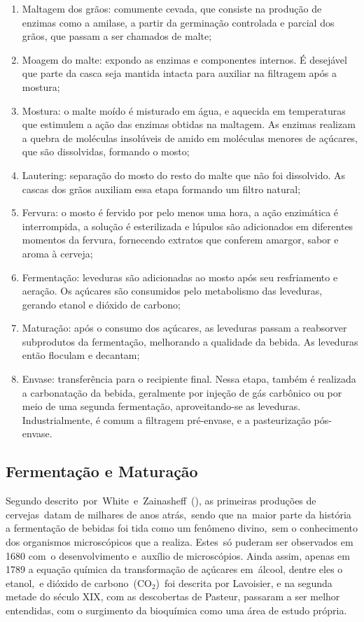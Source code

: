 \begin{enumerate}
    \item Maltagem dos grãos: comumente cevada, que consiste na produção de
enzimas como a amilase, a partir da germinação controlada e parcial dos
grãos, que passam a ser chamados de malte;
    \item Moagem do malte: expondo as enzimas e componentes internos. É desejável
que parte da casca seja mantida intacta para auxiliar na filtragem após a
mostura;
    \item Mostura: o malte moído é misturado em água, e aquecida em temperaturas
que estimulem a ação das enzimas obtidas na maltagem. As enzimas
realizam a quebra de moléculas insolúveis de amido em moléculas menores
de açúcares, que são dissolvidas, formando o mosto;
    \item Lautering: separação do mosto do resto do malte que não foi dissolvido. As
cascas dos grãos auxiliam essa etapa formando um filtro natural;
    \item Fervura: o mosto é fervido por pelo menos uma hora, a ação enzimática é
interrompida, a solução é esterilizada e lúpulos são adicionados em diferentes
momentos da fervura, fornecendo extratos que conferem amargor, sabor e
aroma à cerveja;
    \item Fermentação: leveduras são adicionadas ao mosto após seu resfriamento e
aeração. Os açúcares são consumidos pelo metabolismo das leveduras,
gerando etanol e dióxido de carbono;
    \item Maturação: após o consumo dos açúcares, as leveduras passam a reabsorver
subprodutos da fermentação, melhorando a qualidade da bebida. As
leveduras então floculam e decantam;
    \item Envase: transferência para o recipiente final. Nessa etapa, também é
realizada a carbonatação da bebida, geralmente por injeção de gás carbônico
ou por meio de uma segunda fermentação, aproveitando-se as leveduras.
Industrialmente, é comum a filtragem pré-envase, e a pasteurização pós-
envase.
\end{enumerate}

\subsection{Fermentação e Maturação}


Segundo descrito por White e Zainasheff (), as primeiras produções de
cervejas datam de milhares de anos atrás, sendo que na maior parte da história a
fermentação de bebidas foi tida como um fenômeno divino, sem o conhecimento dos
organismos microscópicos que a realiza. Estes só puderam ser observados em 1680
com o desenvolvimento e auxílio de microscópios. Ainda assim, apenas em 1789 a
equação química da transformação de açúcares em álcool, dentre eles o etanol, e
dióxido de carbono ($\mathrm{CO_2}$) foi descrita por Lavoisier, e na segunda metade do século
XIX, com as descobertas de Pasteur, passaram a ser melhor entendidas, com o
surgimento da bioquímica como uma área de estudo própria. 



